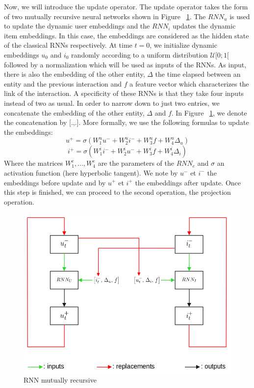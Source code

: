 Now, we will introduce the update operator. The update operator takes the form of two mutually recursive neural networks shown in Figure ~\ref{recursive RNNs}. The $RNN_u$ is used to update the dynamic user embeddings and the $RNN_i$ updates the dynamic item embeddings. In this case, the embeddings are considered as the hidden state of the classical RNNs respectively. At time $t=0$, we initialize dynamic embeddings $u_0$ and $i_0$ randomly according to a uniform distribution $\mathcal{U}[0;1[$ followed by a normalization which will be used as inputs of the RNNs. As input, there is also the embedding of the other entity, $\Delta$ the time elapsed between an entity and the previous interaction and $f$ a feature vector which characterizes the link of the interaction. A specificity of these RNNs is that they take four inputs instead of two as usual. In order to narrow down to just two entries, we concatenate the embedding of the other entity, $\Delta$ and $f$. In Figure ~\ref{recursive RNNs}, we denote the concatenation by [.,.]. More formally, we use the following formulas to update the embeddings:
$$
u^+ = \sigma \left ( W_1^u u^- + W_2^u i^- + W_3^u f + W_4^u \Delta_u \right )
$$
$$
i^+ = \sigma \left ( W_1^i i^- + W_2^i u^- + W_3^i f + W_4^i \Delta_i \right )
$$
Where the matrices $W_1^e, ..., W_4^e$ are the parameters of the $RNN_e$ and $\sigma$ an activation function (here hyperbolic tangent). We note by $u^-$ et $i^-$ the embeddings before update and by $u^+$ et $i^+$ the embeddings after update. Once this step is finished, we can proceed to the second operation, the projection operation.

\begin{figure}[H]
   
   \centering
    \includegraphics[scale = 0.4]{image/rnn_mutually.png}
    \caption{RNN mutually recursive}
    \label{recursive RNNs}
\end{figure}


